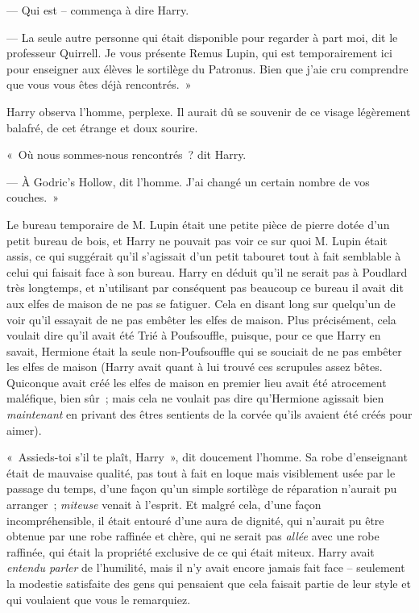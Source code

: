 --- Qui est -- commença à dire Harry.

--- La seule autre personne qui était disponible pour regarder à part moi, dit le professeur Quirrell.
Je vous présente Remus Lupin, qui est temporairement ici pour enseigner aux élèves le sortilège du Patronus.
Bien que j'aie cru comprendre que vous vous êtes déjà rencontrés.~»

Harry observa l'homme, perplexe.
Il aurait dû se souvenir de ce visage légèrement balafré, de cet étrange et doux sourire.

«~Où nous sommes-nous rencontrés~? dit Harry.

--- À Godric's Hollow, dit l'homme.
J'ai changé un certain nombre de vos couches.~»

\later

Le bureau temporaire de M. Lupin était une petite pièce de pierre dotée d'un petit bureau de bois, et Harry ne pouvait pas voir ce sur quoi M. Lupin était assis, ce qui suggérait qu'il s'agissait d'un petit tabouret tout à fait semblable à celui qui faisait face à son bureau.
Harry en déduit qu'il ne serait pas à Poudlard très longtemps, et n'utilisant par conséquent pas beaucoup ce bureau il avait dit aux elfes de maison de ne pas se fatiguer.
Cela en disant long sur quelqu'un de voir qu'il essayait de ne pas embêter les elfes de maison.
Plus précisément, cela voulait dire qu'il avait été Trié à Poufsouffle, puisque, pour ce que Harry en savait, Hermione était la seule non-Poufsouffle qui se souciait de ne pas embêter les elfes de maison (Harry avait quant à lui trouvé ces scrupules assez bêtes.
Quiconque avait créé les elfes de maison en premier lieu avait été atrocement maléfique, bien sûr~; mais cela ne voulait pas dire qu'Hermione agissait bien \emph{maintenant} en privant des êtres sentients de la corvée qu'ils avaient été créés pour aimer).

«~Assieds-toi s'il te plaît, Harry~», dit doucement l'homme.
Sa robe d'enseignant était de mauvaise qualité, pas tout à fait en loque mais visiblement usée par le passage du temps, d'une façon qu'un simple sortilège de réparation n'aurait pu arranger~; \emph{miteuse} venait à l'esprit.
Et malgré cela, d'une façon incompréhensible, il était entouré d'une aura de dignité, qui n'aurait pu être obtenue par une robe raffinée et chère, qui ne serait pas \emph{allée} avec une robe raffinée, qui était la propriété exclusive de ce qui était miteux.
Harry avait \emph{entendu parler} de l'humilité, mais il n'y avait encore jamais fait face -- seulement la modestie satisfaite des gens qui pensaient que cela faisait partie de leur style et qui voulaient que vous le remarquiez.

